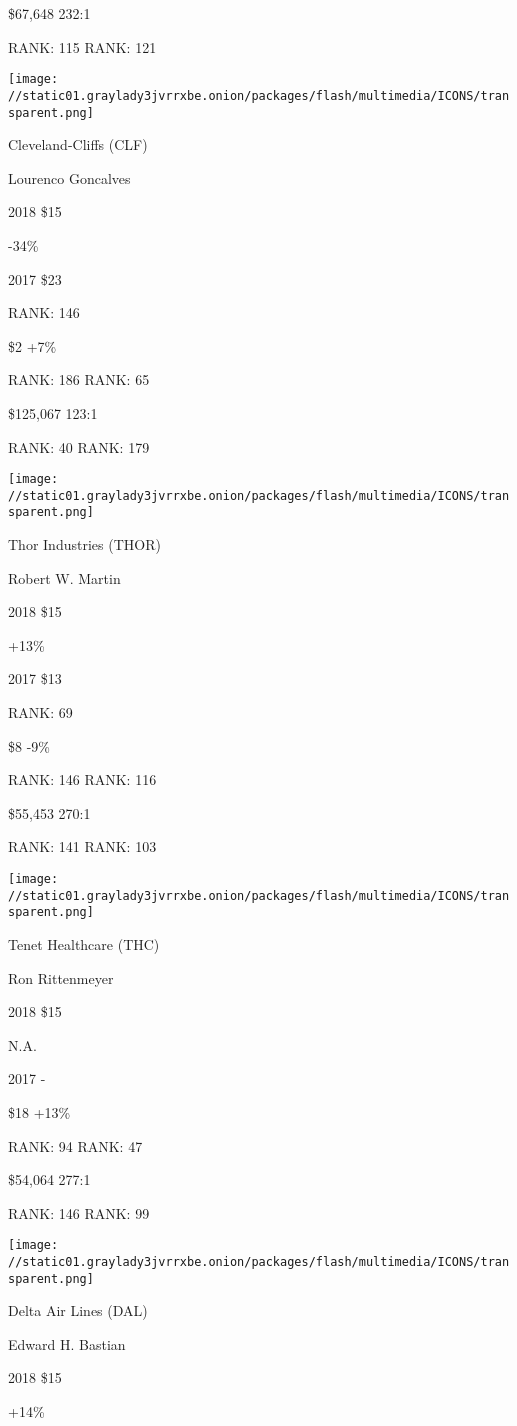  \$67,648 232:1

RANK: 115 RANK: 121

\texttt{[image: //static01.graylady3jvrrxbe.onion/packages/flash/multimedia/ICONS/transparent.png]}

Cleveland-Cliffs (CLF)

Lourenco Goncalves \protect\hyperlink{g-footnotes}{}

2018 \$15

 -34\%

2017 \$23

RANK: 146

 \$2 +7\%

RANK: 186 RANK: 65

 \$125,067 123:1

RANK: 40 RANK: 179

\texttt{[image: //static01.graylady3jvrrxbe.onion/packages/flash/multimedia/ICONS/transparent.png]}

Thor Industries (THOR)

Robert W. Martin \protect\hyperlink{g-footnotes}{}

2018 \$15

 +13\%

2017 \$13

RANK: 69

 \$8 -9\%

RANK: 146 RANK: 116

 \$55,453 270:1

RANK: 141 RANK: 103

\texttt{[image: //static01.graylady3jvrrxbe.onion/packages/flash/multimedia/ICONS/transparent.png]}

Tenet Healthcare (THC)

Ron Rittenmeyer \protect\hyperlink{g-footnotes}{}

2018 \$15

 N.A.

2017 -

 \$18 +13\%

RANK: 94 RANK: 47

 \$54,064 277:1

RANK: 146 RANK: 99

\texttt{[image: //static01.graylady3jvrrxbe.onion/packages/flash/multimedia/ICONS/transparent.png]}

Delta Air Lines (DAL)

Edward H. Bastian \protect\hyperlink{g-footnotes}{}

2018 \$15

 +14\%

